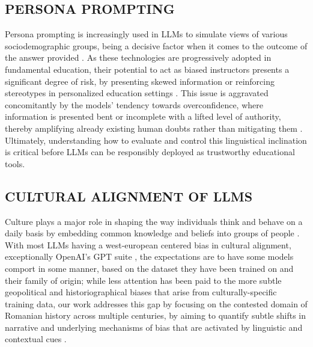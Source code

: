 \documentclass[11pt]{article}
\begin{document}
\subsection{\MakeUppercase{Persona prompting}}
Persona prompting is increasingly used in LLMs to simulate views of various sociodemographic groups, being a decisive factor when it comes to the outcome of the answer provided \cite{lutz2025}. As these technologies are progressively adopted in fundamental education, their potential to act as biased instructors presents a significant degree of risk, by presenting skewed information or reinforcing stereotypes in personalized education settings \cite{weissburg2025}. This issue is aggravated concomitantly by the models' tendency towards overconfidence, where information is presented bent or incomplete with a lifted level of authority, thereby amplifying already existing human doubts rather than mitigating them \cite{sun2025}. Ultimately, understanding how to evaluate and control this linguistical inclination is critical before LLMs can be responsibly deployed as trustworthy educational tools.

\subsection{\MakeUppercase{Cultural alignment of LLMs}}
Culture plays a major role in shaping the way individuals think and behave on a daily basis \cite{oyserman2008} by embedding common knowledge and beliefs into groups of people \cite{hofstede2001}. With most LLMs having a west-european centered bias in cultural alignment, exceptionally OpenAI's GPT suite \cite{tao2024}, the expectations are to have some models comport in some manner, based on the dataset they have been trained on and their family of origin; while less attention has been paid to the more subtle geopolitical and historiographical biases that arise from culturally-specific training data, our work addresses this gap by focusing on the contested domain of Romanian history across multiple centuries, by aiming to quantify subtle shifts in narrative and underlying mechanisms of bias that are activated by linguistic and contextual cues \cite{bhatia2024}.
\end{document}
